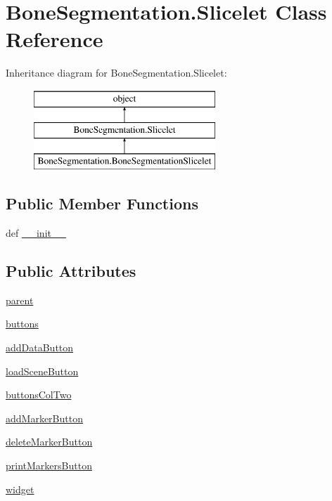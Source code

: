 \hypertarget{class_bone_segmentation_1_1_slicelet}{}\section{Bone\+Segmentation.\+Slicelet Class Reference}
\label{class_bone_segmentation_1_1_slicelet}
Inheritance diagram for Bone\+Segmentation.\+Slicelet\+:\begin{figure}[H]
\begin{center}
\leavevmode
\includegraphics[height=3.000000cm]{class_bone_segmentation_1_1_slicelet}
\end{center}
\end{figure}
\subsection*{Public Member Functions}
\begin{DoxyCompactItemize}
\item 
def \hyperlink{class_bone_segmentation_1_1_slicelet_a9a52cc43bcdb068afd75c64af5df2dd3}{\+\_\+\+\_\+init\+\_\+\+\_\+}
\end{DoxyCompactItemize}
\subsection*{Public Attributes}
\begin{DoxyCompactItemize}
\item 
\hyperlink{class_bone_segmentation_1_1_slicelet_aca71eb02d750fd28af4b5c154ff243af}{parent}
\item 
\hyperlink{class_bone_segmentation_1_1_slicelet_af664e9fb7102f143122def489d7274ba}{buttons}
\item 
\hyperlink{class_bone_segmentation_1_1_slicelet_ac817c61a0c0ebd93996cf88c7a0e993f}{add\+Data\+Button}
\item 
\hyperlink{class_bone_segmentation_1_1_slicelet_ad6a6e46817322b3e798bd1f0bf4e1517}{load\+Scene\+Button}
\item 
\hyperlink{class_bone_segmentation_1_1_slicelet_ac7a8c45c28db3f0ec392fa1a3ece82e4}{buttons\+Col\+Two}
\item 
\hyperlink{class_bone_segmentation_1_1_slicelet_a3024a9863f8c9717ccdd8f3d240d6a5c}{add\+Marker\+Button}
\item 
\hyperlink{class_bone_segmentation_1_1_slicelet_ae426d40722b7369c63d394bcebc10a9c}{delete\+Marker\+Button}
\item 
\hyperlink{class_bone_segmentation_1_1_slicelet_aa21581cbef1468a9b9227cde81133580}{print\+Markers\+Button}
\item 
\hyperlink{class_bone_segmentation_1_1_slicelet_ae7ccf3cfd1b74f947d130b1cf5441411}{widget}
\end{DoxyCompactItemize}


